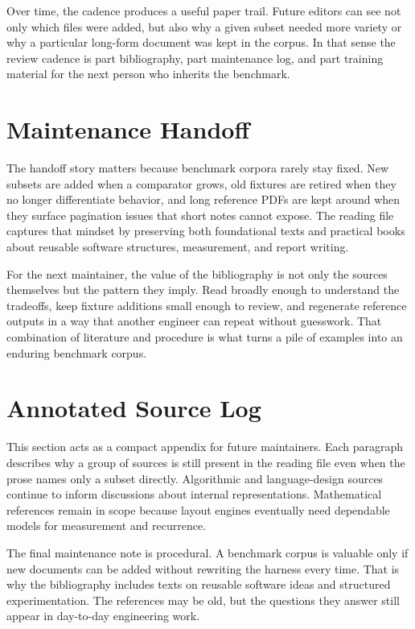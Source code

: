 \documentclass{article}
\begin{document}
Over time, the cadence produces a useful paper trail. Future editors can see not
only which files were added, but also why a given subset needed more variety or
why a particular long-form document was kept in the corpus. In that sense the
review cadence is part bibliography, part maintenance log, and part training
material for the next person who inherits the benchmark.

\clearpage
\section{Maintenance Handoff}
The handoff story matters because benchmark corpora rarely stay fixed. New
subsets are added when a comparator grows, old fixtures are retired when they no
longer differentiate behavior, and long reference PDFs are kept around when they
surface pagination issues that short notes cannot expose. The reading file
captures that mindset by preserving both foundational texts and practical books
about reusable software structures, measurement, and report writing.

For the next maintainer, the value of the bibliography is not only the sources
themselves but the pattern they imply. Read broadly enough to understand the
tradeoffs, keep fixture additions small enough to review, and regenerate
reference outputs in a way that another engineer can repeat without guesswork.
That combination of literature and procedure is what turns a pile of examples
into an enduring benchmark corpus.

\clearpage
\section{Annotated Source Log}
This section acts as a compact appendix for future maintainers. Each paragraph
describes why a group of sources is still present in the reading file even when
the prose names only a subset directly. Algorithmic and language-design sources
continue to inform discussions about internal representations. Mathematical
references remain in scope because layout engines eventually need dependable
models for measurement and recurrence.

The final maintenance note is procedural. A benchmark corpus is valuable only if
new documents can be added without rewriting the harness every time. That is why
the bibliography includes texts on reusable software ideas and structured
experimentation. The references may be old, but the questions they answer still
appear in day-to-day engineering work.

\nocite{aho86,backus78,bentley86,brooks75,chomsky57,dijkstra68,fisher35}
\nocite{gamma95,glass02,golub96,gray93,hearn83,hoare69,kernighan99,knuth84}
\nocite{knuth92,lamport94,mittelbach04,milner78,press92,rudin76,shannon48}
\nocite{steele90,strunk79,tarjan72,tukey77,wilf94,wirth71}


\end{document}
